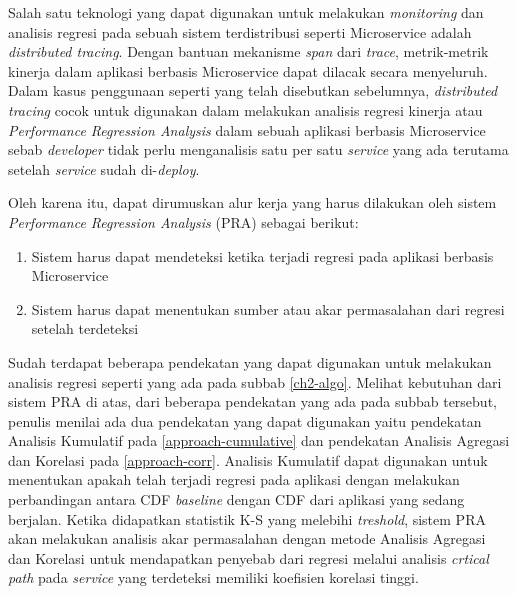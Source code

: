 Salah satu teknologi yang dapat digunakan untuk melakukan \textit{monitoring} dan analisis regresi pada sebuah sistem terdistribusi seperti Microservice adalah \textit{distributed tracing}. Dengan bantuan mekanisme \textit{span} dari \textit{trace}, metrik-metrik kinerja dalam aplikasi berbasis Microservice dapat dilacak secara menyeluruh. Dalam kasus penggunaan seperti yang telah disebutkan sebelumnya, \textit{distributed tracing} cocok untuk digunakan dalam melakukan analisis regresi kinerja atau \textit{Performance Regression Analysis} dalam sebuah aplikasi berbasis Microservice sebab \textit{developer} tidak perlu menganalisis satu per satu \textit{service} yang ada terutama setelah \textit{service} sudah di-\textit{deploy}.


Oleh karena itu, dapat dirumuskan alur kerja yang harus dilakukan oleh sistem \textit{Performance Regression Analysis} (PRA) sebagai berikut:
\begin{enumerate}
	\item Sistem harus dapat mendeteksi ketika terjadi regresi pada aplikasi berbasis Microservice
	\item Sistem harus dapat menentukan sumber atau akar permasalahan dari regresi setelah terdeteksi
\end{enumerate}



Sudah terdapat beberapa pendekatan yang dapat digunakan untuk melakukan analisis regresi seperti yang ada pada subbab \ref{ch2-algo}. Melihat kebutuhan dari sistem PRA di atas, dari beberapa pendekatan yang ada pada subbab tersebut, penulis menilai ada dua pendekatan yang dapat digunakan yaitu pendekatan Analisis Kumulatif pada \ref{approach-cumulative} dan pendekatan Analisis Agregasi dan Korelasi pada \ref{approach-corr}. Analisis Kumulatif dapat digunakan untuk menentukan apakah telah terjadi regresi pada aplikasi dengan melakukan perbandingan antara CDF \textit{baseline} dengan CDF dari aplikasi yang sedang berjalan. Ketika didapatkan statistik K-S yang melebihi \textit{treshold}, sistem PRA akan melakukan analisis akar permasalahan dengan metode Analisis Agregasi dan Korelasi untuk mendapatkan penyebab dari regresi melalui analisis \textit{crtical path} pada \textit{service} yang terdeteksi memiliki koefisien korelasi tinggi. 



